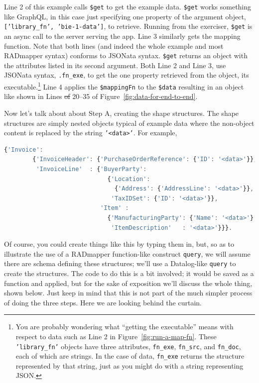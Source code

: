 \documentclass[10pt,letterpaper]{article} %
\newcommand{\stt}[1]{\texttt{#1}} %
\providecommand{\DIFadd}[1]{{\protect\color{blue}\uwave{#1}}} %
\providecommand{\DIFdel}[1]{{\protect\color{red}\sout{#1}}}                      %
\providecommand{\DIFaddbegin}{} %
\providecommand{\DIFaddend}{} %
\providecommand{\DIFdelbegin}{} %
\providecommand{\DIFdelend}{} %
\newcommand{\DIFscaledelfig}{0.5}
\newlength{\DIFdelgraphicswidth} %
\newlength{\DIFdelgraphicsheight} %
\newcommand{\DIFaddincludegraphics}[2][]{{\color{blue}\fbox{\DIFOincludegraphics[#1]{#2}}}} %
\newcommand{\DIFdelincludegraphics}[2][]{%
\sbox{\DIFdelgraphicsbox}{\DIFOincludegraphics[#1]{#2}}%
\settoboxwidth{\DIFdelgraphicswidth}{\DIFdelgraphicsbox} %
\settoboxtotalheight{\DIFdelgraphicsheight}{\DIFdelgraphicsbox} %
\scalebox{\DIFscaledelfig}{%
\parbox[b]{\DIFdelgraphicswidth}{\usebox{\DIFdelgraphicsbox}\\[-\baselineskip] \rule{\DIFdelgraphicswidth}{0em}}\llap{\resizebox{\DIFdelgraphicswidth}{\DIFdelgraphicsheight}{%
\setlength{\unitlength}{\DIFdelgraphicswidth}%
\begin{picture}(1,1)%
\thicklines\linethickness{2pt} %
{\color[rgb]{1,0,0}\put(0,0){\framebox(1,1){}}}%
{\color[rgb]{1,0,0}\put(0,0){\line( 1,1){1}}}%
{\color[rgb]{1,0,0}\put(0,1){\line(1,-1){1}}}%
\end{picture}%
}\hspace*{3pt}}} %
} %
\DeclareRobustCommand{\DIFaddbegin}{\DIFOaddbegin \let\includegraphics\DIFaddincludegraphics} %
\DeclareRobustCommand{\DIFaddend}{\DIFOaddend \let\includegraphics\DIFOincludegraphics} %
\DeclareRobustCommand{\DIFdelbegin}{\DIFOdelbegin \let\includegraphics\DIFdelincludegraphics} %
\DeclareRobustCommand{\DIFdelend}{\DIFOaddend \let\includegraphics\DIFOincludegraphics} %
\begin{document}
Line 2 of this example calls \stt{\$get} to get the example data.
\stt{\$get} works something like GraphQL, in this case just specifying one property of the argument object, \stt{['library\_fn', 'bie-1-data']}, to retrieve.
Running from the exerciser, \stt{\$get} is an async call to the server serving the app.
Line 3 similarly gets the mapping function. Note that both lines (and indeed the whole example and most RADmapper syntax) conforms to JSONata syntax.
\stt{\$get} returns an object with the attributes listed in its second argument.
Both Line 2 and Line 3, use JSONata syntax, \stt{.fn\_exe}, to get the one property retrieved from the object, its executable.\footnote{You are probably wondering what ``getting the executable'' means with respect to  data such as Line 2 in Figure~\ref{fig:run-a-map-fn}.
  These \stt{'library\_fn'} objects have three attributes, \stt{fn\_exe}, \stt{fn\_src}, and \stt{fn\_doc},
  each of which are strings.
  In the case of data, \stt{fn\_exe} returns the structure represented by that string, just as you might do with a string representing JSON.}
Line 4 applies the \stt{\$mappingFn} to the \stt{\$data} resulting in an object like shown in Lines \DIFdelbegin \DIFdel{of }\DIFdelend 20--35 of Figure~\ref{fig:data-for-end-to-end}.

Now let's talk about about Step A, creating the shape structures.
The shape structures are simply nested objects typical of example data where the non-object content is replaced by the string \stt{'<data>'}.
For example,

\begin{lstlisting}[language=JavaScript,numbers=none,basicstyle=\ttfamily\scriptsize]
      {'Invoice':
        {'InvoiceHeader': {'PurchaseOrderReference': {'ID': '<data>'}},
         'InvoiceLine'  : {'BuyerParty':
                             {'Location':
                               {'Address': {'AddressLine': '<data>'}},
                              'TaxIDSet': {'ID': '<data>'}},
                           'Item' :
                             {'ManufacturingParty': {'Name': '<data>'}
                              'ItemDescription'   : '<data>'}}}.
\end{lstlisting} \vspace{-2em}
Of course, you could create things like this by typing them in, but, so as to illustrate the use of a RADmapper function-like construct \DIFaddbegin \DIFadd{like }\DIFaddend \stt{query}, we will assume there are schema defining these structures; we'll use a Datalog-like \stt{query} to create the structures. The code to do this is a bit involved; it would be saved as a function and applied, but for the sake of exposition we'll discuss the whole thing, shown below.
Just keep in mind that this is not part of the much simpler process of doing the three steps.
Here we are looking behind the curtain.
\end{document}
